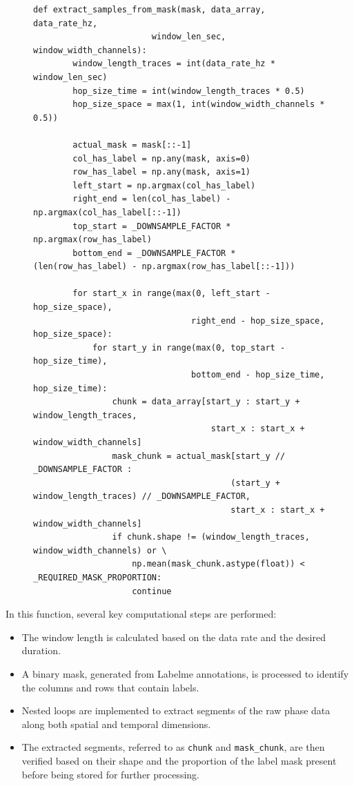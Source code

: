\begin{figure}[htbp]
  \centering
  \begin{minipage}{\linewidth}
    \begin{lstlisting}[style=pythonstyle, caption={Core logic for extracting samples from a mask}, label=lst:core_extraction]
    def extract_samples_from_mask(mask, data_array, data_rate_hz, 
                        window_len_sec, window_width_channels):
        window_length_traces = int(data_rate_hz * window_len_sec)
        hop_size_time = int(window_length_traces * 0.5)
        hop_size_space = max(1, int(window_width_channels * 0.5))
        
        actual_mask = mask[::-1]
        col_has_label = np.any(mask, axis=0)
        row_has_label = np.any(mask, axis=1)
        left_start = np.argmax(col_has_label)
        right_end = len(col_has_label) - np.argmax(col_has_label[::-1])
        top_start = _DOWNSAMPLE_FACTOR * np.argmax(row_has_label)
        bottom_end = _DOWNSAMPLE_FACTOR * (len(row_has_label) - np.argmax(row_has_label[::-1]))
        
        for start_x in range(max(0, left_start - hop_size_space), 
                                right_end - hop_size_space, hop_size_space):
            for start_y in range(max(0, top_start - hop_size_time), 
                                bottom_end - hop_size_time, hop_size_time):
                chunk = data_array[start_y : start_y + window_length_traces, 
                                    start_x : start_x + window_width_channels]
                mask_chunk = actual_mask[start_y // _DOWNSAMPLE_FACTOR : 
                                        (start_y + window_length_traces) // _DOWNSAMPLE_FACTOR,
                                        start_x : start_x + window_width_channels]
                if chunk.shape != (window_length_traces, window_width_channels) or \
                    np.mean(mask_chunk.astype(float)) < _REQUIRED_MASK_PROPORTION:
                    continue
    \end{lstlisting}
  \end{minipage}
\end{figure}

In this function, several key computational steps are performed:
    \begin{itemize}
        \item The window length is calculated based on the data rate and the desired duration.
        \item A binary mask, generated from Labelme annotations, is processed to identify the columns and rows that contain labels.
        \item Nested loops are implemented to extract segments of the raw phase data along both spatial and temporal dimensions.
        \item The extracted segments, referred to as \texttt{chunk} and \texttt{mask\_chunk}, are then verified based on their shape and the proportion of the label mask present before being stored for further processing.
    \end{itemize}

